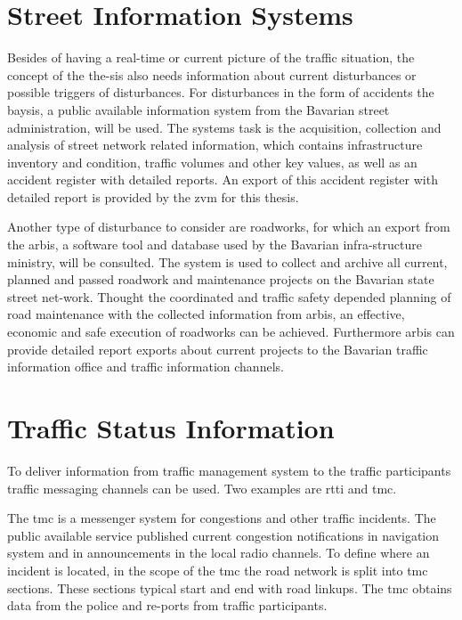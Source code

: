 \documentclass[a4paper,12pt]{report}
\begin{document}
\section{Street Information Systems}

\par Besides of having a real-time or current picture of the traffic situation, the concept of the the-sis also needs information about current disturbances or possible triggers of disturbances. For disturbances in the form of accidents the \acrfull{baysis}, a public available information system from the Bavarian street administration, will be used. The systems task is the acquisition, collection and analysis of street network related information, which contains infrastructure inventory and condition, traffic volumes and other key values, as well as an accident register with detailed reports. An export of this accident register with detailed report is provided by the \acrshort{zvm} for this thesis.

\par Another type of disturbance to consider are roadworks, for which an export from the \acrfull{arbis}, a software tool and database used by the Bavarian infra-structure ministry, will be consulted. The system is used to collect and archive all current, planned and passed roadwork and maintenance projects on the Bavarian state street net-work. Thought the coordinated and traffic safety depended planning of road maintenance with the collected information from \acrshort{arbis}, an effective, economic and safe execution of roadworks can be achieved. Furthermore \acrshort{arbis} can provide detailed report exports about current projects to the Bavarian traffic information office and traffic information channels. \cite{trafficon2017}

\section{Traffic Status Information}

\par To deliver information from traffic management system to the traffic participants traffic messaging channels can be used. Two examples are \acrfull{rtti} and \acrfull{tmc}.

\par The \acrfull{tmc} is a messenger system for congestions and other traffic incidents. The public available service published current congestion notifications in navigation system and in announcements in the local radio channels. To define where an incident is located, in the scope of the \acrshort{tmc} the road network is split into \acrshort{tmc} sections. These sections typical start and end with road linkups. The \acrshort{tmc} obtains data from the police and re-ports from traffic participants. \cite{LAPID2020}
\end{document}
